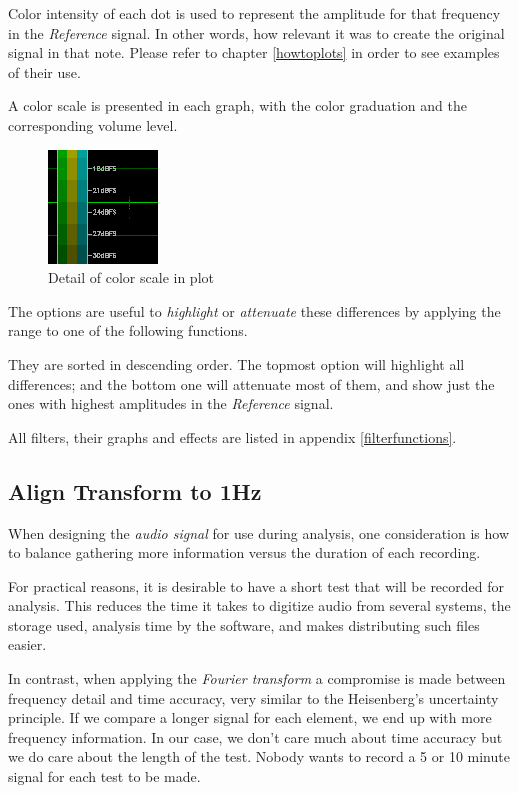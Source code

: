 \documentclass[10pt,a4paper]{report}
\begin{document}
\begin{appendices}
Color intensity of each dot is used to represent the amplitude for that frequency in the \textit{Reference} signal. In other words, how relevant it was to create the original signal in that note. Please refer to chapter \ref{howtoplots} in order to see examples of their use.

A color scale is presented in each graph, with the color graduation and the corresponding volume level.

\begin{figure}[H]
	\centering
	\includegraphics[width=0.2\linewidth]{images/colorfilter/colorscale.png}
	\caption[Plot color scale]{Detail of color scale in plot}
	\label{fig:colorscale}
\end{figure}

The options are useful to \textit{highlight} or \textit{attenuate} these differences by applying the range to one of the following functions. 

They are sorted in descending order. The topmost option will highlight all differences; and the bottom one will attenuate most of them, and show just the ones with highest amplitudes in the \textit{Reference} signal.

All filters, their graphs and effects are listed in appendix \ref{filterfunctions}.

\subsection{Align Transform to 1Hz}

When designing the \textit{audio signal} for use during analysis, one consideration is how to balance gathering more information versus the duration of each recording. 

For practical reasons, it is desirable to have a short test that will be recorded for analysis. This reduces the time it takes to digitize audio from several systems, the storage used, analysis time by the software, and makes distributing such files easier.

In contrast, when applying the \textit{Fourier transform} a compromise is made between frequency detail and time accuracy, very similar to the Heisenberg's uncertainty principle. If we compare a longer signal for each element, we end up with more frequency information. In our case, we don't care much about time accuracy but we do care about the length of the test. Nobody wants to record a 5 or 10 minute signal for each test to be made.


\end{appendices}
\end{document}
